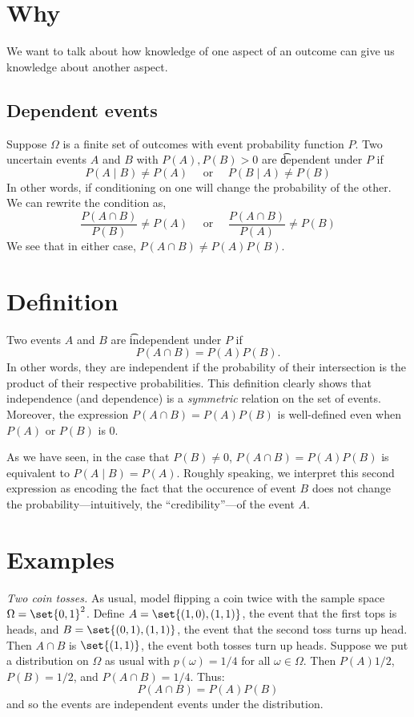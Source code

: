 
\section*{Why}

We want to talk about how knowledge of one aspect of an outcome can give us knowledge about another aspect.

\subsection*{Dependent events}

Suppose $\Omega $ is a finite set of outcomes with event probability function $P$.
Two uncertain events $A$ and $B$ with $P(A), P(B) > 0$ are \t{dependent} under $P$ if
\[
P(A \mid  B) \neq P(A) \quad \text{ or } \quad P(B \mid  A) \neq P(B)
\]
In other words, if conditioning on one will change the probability of the other.
We can rewrite the condition as,
\[
\frac{P(A \cap  B)}{P(B)} \neq P(A) \quad \text{ or } \quad \frac{P(A \cap  B)}{P(A)} \neq P(B)
\]
We see that in either case, $P(A \cap  B) \neq P(A)P(B)$.

\section*{Definition}

Two events $A$ and $B$ are \t{independent} under $P$ if
\[
P(A \cap  B) = P(A)P(B).
\]
In other words, they are independent if the probability of their intersection is the product of their respective probabilities.
This definition clearly shows that independence (and dependence) is a \textit{symmetric} relation on the set of events.
Moreover, the expression $P(A \cap  B) = P(A)P(B)$ is well-defined even when $P(A)$ or $P(B)$ is 0.

As we have seen, in the case that $P(B) \neq 0$, $P(A \cap B) = P(A)P(B)$ is equivalent to $P(A \mid B) = P(A)$.
Roughly speaking, we interpret this second expression as encoding the fact that the occurence of event $B$ does not change the probability---intuitively, the ``credibility''---of the event $A$.

\section*{Examples}

\textit{Two coin tosses.}
As usual, model flipping a coin twice with the sample space $\Omega  = \set{0,1}^2$.
Define $A = \set{(1,0), (1, 1)}$, the event that the first tops is heads, and $B = \set{(0,1), (1,1)}$, the event that the second toss turns up head.
Then $A \cap  B$ is $\set{(1,1)}$, the event both tosses turn up heads.
Suppose we put a distribution on $\Omega $ as usual with $p(\omega ) = 1/4$ for all $\omega  \in \Omega $.
Then $P(A) 1/2$, $P(B) = 1/2$, and $P(A \cap  B) = 1/4$.
Thus:
\[
P(A \cap  B) = P(A)P(B)
\]
and so the events are independent events under the distribution.

